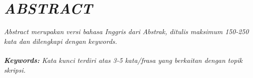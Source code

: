 \chapter*{\centering \textit{ABSTRACT}}

\begin{spacing}{1.25}
\noindent\textit{Abstract merupakan versi bahasa Inggris dari Abstrak, ditulis maksimum 150-250 kata dan dilengkapi dengan keywords.\\\\
\textbf{Keywords:} Kata kunci terdiri atas 3-5 kata/frasa yang berkaitan dengan topik skripsi.}
\end{spacing}